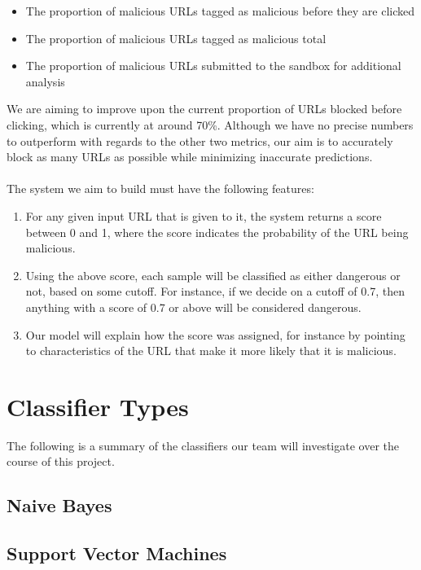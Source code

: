 \documentclass[cs,proposal]{hmcclinic}
\begin{document}
\begin{itemize} \itemsep0em
\item The proportion of malicious URLs tagged as malicious before they are clicked
\item The proportion of malicious URLs tagged as malicious total
\item The proportion of malicious URLs submitted to the sandbox for additional analysis
\end{itemize}

We are aiming to improve upon the current proportion of URLs blocked before clicking, which is currently at around 70\%. Although we have no precise numbers to outperform with regards to the other two metrics, our aim is to accurately block as many URLs as possible while minimizing inaccurate predictions.
\\\\
The system we aim to build must have the following features:

\begin{enumerate} \itemsep0em
\item For any given input URL that is given to it, the system returns a score between 0 and 1, where the score indicates the probability of the URL being malicious.
\item Using the above score, each sample will be classified as either dangerous or not, based on some cutoff. For instance, if we decide on a cutoff of 0.7, then anything with a score of 0.7 or above will be considered dangerous.
\item Our model will explain how the score was assigned, for instance by pointing to characteristics of the URL that make it more likely that it is malicious.
\end{enumerate}


\section{Classifier Types}

The following is a summary of the classifiers our team will investigate over the course of this project.

\subsection{Naive Bayes}

\subsection{Support Vector Machines}
\end{document}
